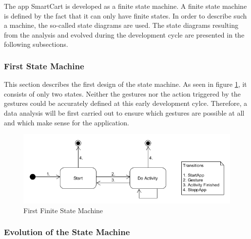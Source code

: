 The app SmartCart is developed as a finite state machine. A finite state machine
is defined by the fact that it can only have finite states. In order to describe
such a machine, the so-called state diagrams are used. The state diagrams
resulting from the analysis and evolved during the development cycle are
presented in the following subsections.

\subsubsection{First State Machine}

This section describes the first design of the state machine. As seen in
figure \ref{fig:first state machine}, it consists of only two states. Neither the
gestures nor the action triggered by the gestures could be accurately defined at
this early development cylce. Therefore, a data analysis will be first carried
out to ensure which gestures are possible at all and which make sense for the
application.

\begin{figure}[h!]
\centering
\captionsetup{justification=centering}
\includegraphics[width=\textwidth]{res/sa/PresentationStateMachineOld.png}
\caption{First Finite State Machine}
\label{fig:first state machine}
\end{figure}

\subsubsection{Evolution of the State Machine}

